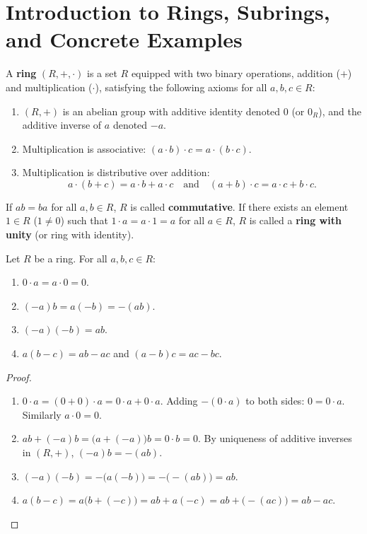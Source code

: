 \section{Introduction to Rings, Subrings, and Concrete Examples}
\label{sec:rings_intro}

\begin{definition}[Ring]
A \textbf{ring} $(R, +, \cdot)$ is a set $R$ equipped with two binary operations, addition ($+$) and multiplication ($\cdot$), satisfying the following axioms for all $a, b, c \in R$:
\begin{enumerate}[label=\textbf{(\arabic*)}, leftmargin=*, itemsep=4pt]
    \item $(R, +)$ is an abelian group with additive identity denoted $0$ (or $0_R$), and the additive inverse of $a$ denoted $-a$.
    \item Multiplication is associative: $(a \cdot b) \cdot c = a \cdot (b \cdot c)$.
    \item Multiplication is distributive over addition:
    \begin{equation}
    a \cdot (b + c) = a \cdot b + a \cdot c \quad \text{and} \quad (a + b) \cdot c = a \cdot c + b \cdot c.
    \end{equation}
\end{enumerate}
If $ab = ba$ for all $a, b \in R$, $R$ is called \textbf{commutative}.
If there exists an element $1 \in R$ ($1 \ne 0$) such that $1 \cdot a = a \cdot 1 = a$ for all $a \in R$, $R$ is called a \textbf{ring with unity} (or ring with identity).
\end{definition}

\begin{proposition}
\label{prop:ring_arithmetic}
Let $R$ be a ring. For all $a, b, c \in R$:
\begin{enumerate}[label=\textbf{(\roman*)}, leftmargin=*, itemsep=4pt]
    \item $0 \cdot a = a \cdot 0 = 0$.
    \item $(-a)b = a(-b) = -(ab)$.
    \item $(-a)(-b) = ab$.
    \item $a(b - c) = ab - ac$ and $(a - b)c = ac - bc$.
\end{enumerate}
\end{proposition}

\begin{proof}
\begin{enumerate}[label=\textbf{(\roman*)}, leftmargin=*, itemsep=6pt]
    \item $0 \cdot a = (0 + 0) \cdot a = 0 \cdot a + 0 \cdot a$.
    Adding $-(0 \cdot a)$ to both sides: $0 = 0 \cdot a$. Similarly $a \cdot 0 = 0$.
    \item $ab + (-a)b = \bigl(a + (-a)\bigr)b = 0 \cdot b = 0$.
    By uniqueness of additive inverses in $(R, +)$, $(-a)b = -(ab)$.
    \item $(-a)(-b) = -\bigl(a(-b)\bigr) = -\bigl(-(ab)\bigr) = ab$.
    \item $a(b - c) = a\bigl(b + (-c)\bigr) = ab + a(-c) = ab + \bigl(-(ac)\bigr) = ab - ac$.
\end{enumerate}
\end{proof}

